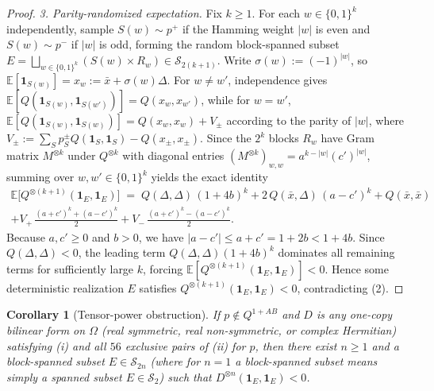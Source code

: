 \documentclass[11pt,a4paper]{article}
\newtheorem{corollary}[theorem]{Corollary}
\theoremstyle{definition}
\theoremstyle{remark}
\newcommand{\ind}[1]{\mathbf{1}_{#1}}
\newcommand{\QAB}{Q^{1+AB}}
\begin{document}
\begin{proof}
\emph{3. Parity-randomized expectation.} Fix $k \ge 1$. For each $w \in \{0,1\}^k$ independently, sample $S(w) \sim p^+$ if the Hamming weight $|w|$ is even and $S(w) \sim p^-$ if $|w|$ is odd, forming the random block-spanned subset $E = \bigsqcup_{w \in \{0,1\}^k} (S(w) \times R_w) \in \mathcal{S}_{2(k+1)}$. Write $\sigma(w) := (-1)^{|w|}$, so $\mathbb{E}[\ind{S(w)}] = x_w := \bar{x} + \sigma(w)\Delta$. For $w \neq w'$, independence gives $\mathbb{E}[Q(\ind{S(w)}, \ind{S(w')})] = Q(x_w, x_{w'})$, while for $w = w'$, $\mathbb{E}[Q(\ind{S(w)}, \ind{S(w)})] = Q(x_w, x_w) + V_\pm$ according to the parity of $|w|$, where $V_\pm := \sum_S p^\pm_S Q(\ind S, \ind S) - Q(x_\pm, x_\pm)$. Since the $2^k$ blocks $R_w$ have Gram matrix $M^{\otimes k}$ under $Q^{\otimes k}$ with diagonal entries $(M^{\otimes k})_{w,w} = a^{k-|w|}(c')^{|w|}$, summing over $w, w' \in \{0,1\}^k$ yields the exact identity
\begin{multline*}
  \mathbb{E}\bigl[Q^{\otimes(k+1)}(\ind E, \ind E)\bigr] \;=\; Q(\Delta, \Delta)\,(1+4b)^k + 2\,Q(\bar{x}, \Delta)\,(a-c')^k + Q(\bar{x}, \bar{x}) \\
  + V_+\,\frac{(a+c')^k + (a-c')^k}{2} + V_-\,\frac{(a+c')^k - (a-c')^k}{2}.
\end{multline*}
Because $a, c' \ge 0$ and $b > 0$, we have $|a - c'| \le a + c' = 1 + 2b < 1 + 4b$. Since $Q(\Delta, \Delta) < 0$, the leading term $Q(\Delta, \Delta)(1+4b)^k$ dominates all remaining terms for sufficiently large $k$, forcing $\mathbb{E}[Q^{\otimes(k+1)}(\ind E, \ind E)] < 0$. Hence some deterministic realization $E$ satisfies $Q^{\otimes(k+1)}(\ind E, \ind E) < 0$, contradicting (2).
\end{proof}

\begin{corollary}[Tensor-power obstruction]\label{c:tensor-power}
If $p \notin \QAB$ and $D$ is any one-copy bilinear form on $\Omega$ (real symmetric, real non-symmetric, or complex Hermitian) satisfying (i) and all $56$ exclusive pairs of (ii) for $p$, then there exist $n \ge 1$ and a block-spanned subset $E \in \mathcal{S}_{2n}$ (where for $n = 1$ a block-spanned subset means simply a spanned subset $E \in \mathcal{S}_2$) such that $D^{\otimes n}(\ind E, \ind E) < 0$.
\end{corollary}
\end{document}
